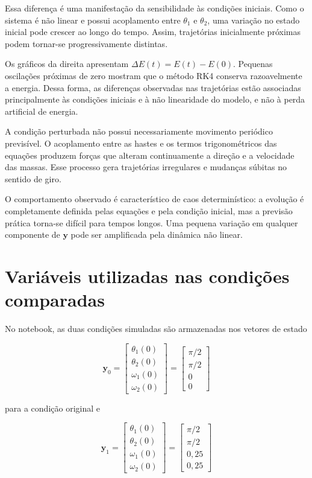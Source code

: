 \documentclass[12pt,a4paper]{article}
\begin{document}
Essa diferença é uma manifestação da sensibilidade às condições iniciais. Como o sistema é não linear e possui acoplamento entre $\theta_1$ e $\theta_2$, uma variação no estado inicial pode crescer ao longo do tempo. Assim, trajetórias inicialmente próximas podem tornar-se progressivamente distintas.

Os gráficos da direita apresentam $\Delta E(t)=E(t)-E(0)$. Pequenas oscilações próximas de zero mostram que o método RK4 conserva razoavelmente a energia. Dessa forma, as diferenças observadas nas trajetórias estão associadas principalmente às condições iniciais e à não linearidade do modelo, e não à perda artificial de energia.

A condição perturbada não possui necessariamente movimento periódico previsível. O acoplamento entre as hastes e os termos trigonométricos das equações produzem forças que alteram continuamente a direção e a velocidade das massas. Esse processo gera trajetórias irregulares e mudanças súbitas no sentido de giro.

O comportamento observado é característico de caos determinístico: a evolução é completamente definida pelas equações e pela condição inicial, mas a previsão prática torna-se difícil para tempos longos. Uma pequena variação em qualquer componente de $\mathbf{y}$ pode ser amplificada pela dinâmica não linear.

\section{Variáveis utilizadas nas condições comparadas}

No notebook, as duas condições simuladas são armazenadas nos vetores de estado

\begin{equation}
\mathbf{y}_0
=
\begin{bmatrix}
\theta_1(0)\\
\theta_2(0)\\
\omega_1(0)\\
\omega_2(0)
\end{bmatrix}
=
\begin{bmatrix}
\pi/2\\
\pi/2\\
0\\
0
\end{bmatrix}
\end{equation}

para a condição original e

\begin{equation}
\mathbf{y}_1
=
\begin{bmatrix}
\theta_1(0)\\
\theta_2(0)\\
\omega_1(0)\\
\omega_2(0)
\end{bmatrix}
=
\begin{bmatrix}
\pi/2\\
\pi/2\\
0{,}25\\
0{,}25
\end{bmatrix}
\end{equation}
\end{document}
